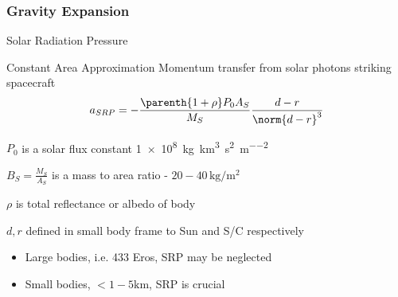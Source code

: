 \begin{frame}[noframenumbering,label=grav] %
\frametitle{Gravity Expansion}

\end{frame}%


\begin{frame}[noframenumbering,label=srp]{Solar Radiation Pressure} %

\begin{block}{Constant Area Approximation}
Momentum transfer from solar photons striking spacecraft
\begin{align*}
    a_{SRP} = - \frac{\parenth{1 + \rho} P_0 A_{S}}{M_S} \frac{d - r}{\norm{d-r}^3}
\end{align*}

\( P_0\) is a solar flux constant \SI{1e8}{\kilogram\kilo\meter\cubed\per\second\squared\per\meter\squared}

\( B_S = \frac{M_S}{A_S} \) is a mass to area ratio - \( 20 - 40 \, \si{\kilogram\per\meter\squared} \)

\( \rho \) is total reflectance or albedo of body

\( d, r \) defined in small body frame to Sun and S/C respectively
\end{block}
\begin{itemize}
    \item Large bodies, i.e. 433 Eros, SRP may be neglected
    \item Small bodies, \( < 1-5 \si{\kilo\meter} \), SRP is crucial
\end{itemize}
\end{frame} %

